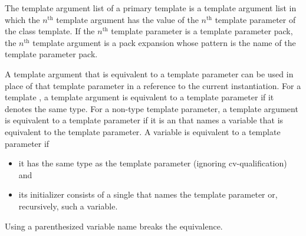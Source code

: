 \pnum
The template argument list of a primary template is a
template argument list in which the
$n^\text{th}$
template argument has the value of the
$n^\text{th}$
template parameter of the class template.
If the $n^\text{th}$ template parameter is a template
parameter pack, the $n^\text{th}$ template argument is a pack
expansion whose pattern is the name of
the template parameter pack.

\pnum
A template argument that is equivalent to a template
parameter can be used in place of that
template parameter in a reference to the current instantiation.
For a template ,
a template argument is equivalent to a template parameter
if it denotes the same type.
For a non-type template parameter,
a template argument is equivalent to a template parameter
if it is an  that names a variable
that is equivalent to the template parameter.
A variable is equivalent to a template parameter if
\begin{itemize}
\item
  it has the same type as the template parameter
  (ignoring cv-qualification) and
\item
  its initializer consists of a single 
  that names the template parameter or, recursively, such a variable.
\end{itemize}
\begin{note}
Using a parenthesized variable name breaks the equivalence.
\end{note}
